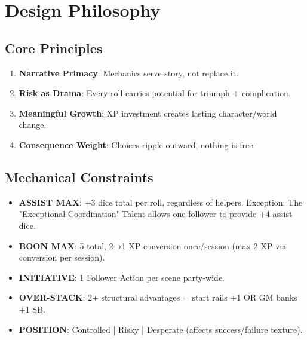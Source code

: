 \section{Design Philosophy}

\subsection{Core Principles}
\begin{enumerate}
    \item \textbf{Narrative Primacy}: Mechanics serve story, not replace it.
    \item \textbf{Risk as Drama}: Every roll carries potential for triumph + complication.
    \item \textbf{Meaningful Growth}: XP investment creates lasting character/world change.
    \item \textbf{Consequence Weight}: Choices ripple outward, nothing is free.
\end{enumerate}

\subsection{Mechanical Constraints}
\begin{itemize}
    \item \textbf{ASSIST MAX}: +3 dice total per roll, regardless of helpers. Exception: The "Exceptional Coordination" Talent allows one follower to provide +4 assist dice.
    \item \textbf{BOON MAX}: 5 total, 2→1 XP conversion once/session (max 2 XP via conversion per session).
    \item \textbf{INITIATIVE}: 1 Follower Action per scene party-wide.
    \item \textbf{OVER-STACK}: 2+ structural advantages = start rails +1 OR GM banks +1 SB.
    \item \textbf{POSITION}: Controlled | Risky | Desperate (affects success/failure texture).
\end{itemize}

